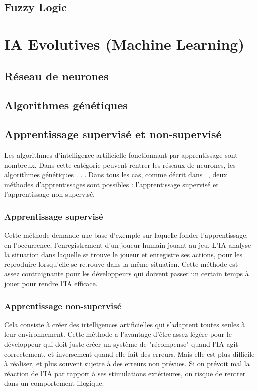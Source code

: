 \documentclass[asi]{picINSA}
\begin{document}
\section{Fuzzy Logic}
  
\chapter{IA Evolutives (Machine Learning)}
\section{Réseau de neurones}

\section{Algorithmes génétiques}
\section{Apprentissage supervisé et non-supervisé}
Les algorithmes d’intelligence artificielle fonctionnant par apprentissage sont nombreux. Dans cette catégorie peuvent rentrer les réseaux de neurones, les algorithmes génétiques . . . Dans tous les cas, comme décrit dans ~\cite{tambellinicomment}, deux méthodes d’apprentissages sont possibles : l’apprentissage supervisé et l’apprentissage non supervisé.

\subsection{Apprentissage supervisé}
Cette méthode demande une base d’exemple sur laquelle fonder l’apprentissage, en l’occurrence, l’enregistrement d’un joueur humain jouant au jeu. L’IA analyse la situation dans laquelle se trouve le joueur et enregistre ses actions, pour les reproduire lorsqu’elle se retrouve dans la même situation. Cette méthode est assez contraignante pour les développeurs qui doivent passer un certain temps à jouer pour rendre l’IA efficace.

\subsection{Apprentissage non-supervisé}
Cela consiste à créer des intelligences artificielles qui s’adaptent toutes seules à leur environnement. Cette méthode a l’avantage d’être assez légère pour le développeur qui doit juste créer un système de "récompense" quand l’IA agit correctement, et inversement  quand elle fait des erreurs. Mais elle est plus difficile à réaliser, et plus souvent sujette à des erreurs non prévues. Si on prévoit mal la réaction de l’IA par rapport à ses stimulations extérieures, on risque de rentrer dans un comportement illogique.
\end{document}
